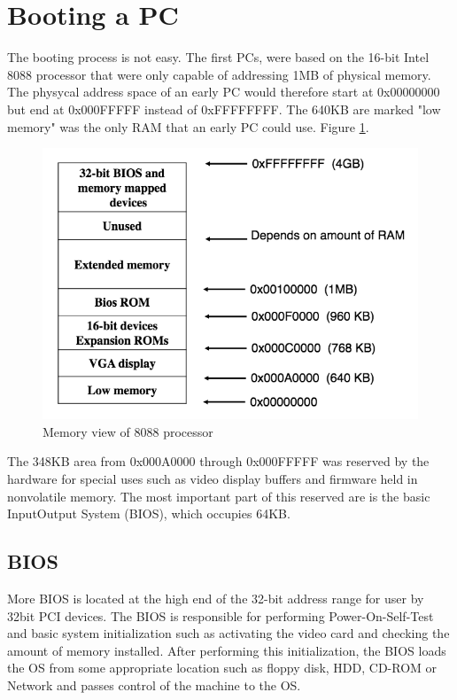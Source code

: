 \documentclass[12pt]{article}
\begin{document}
\section{Booting a PC}
The booting process is not easy. The first PCs, were based on the 16-bit Intel 8088 processor that were only capable of addressing 1MB of physical memory. The physycal address space of an early PC would therefore start at 0x00000000 but end at 0x000FFFFF instead of 0xFFFFFFFF. The 640KB are marked "low memory" was the only RAM that an early PC could use. Figure \ref{fig:memory8088}.
\begin{figure}[h]
  \centering
  \includegraphics[width=0.8\linewidth]{images/memory8088.png}
  \caption{Memory view of 8088 processor}
  \label{fig:memory8088}
\end{figure}
The 348KB area from 0x000A0000 through 0x000FFFFF was reserved by the hardware for special uses such as video display buffers and firmware held in nonvolatile memory. The most important part of this reserved are is the basic Input\/Output System (BIOS), which occupies 64KB.

\subsection{BIOS}
More BIOS is located at the high end of the 32-bit address range for user by 32bit PCI devices. The BIOS is responsible for performing Power-On-Self-Test and basic system initialization such as activating the video card and checking the amount of memory installed. After performing this initialization, the BIOS loads the OS from some appropriate location such as floppy disk, HDD, CD-ROM or Network and passes control of the machine to the OS.
\end{document}

